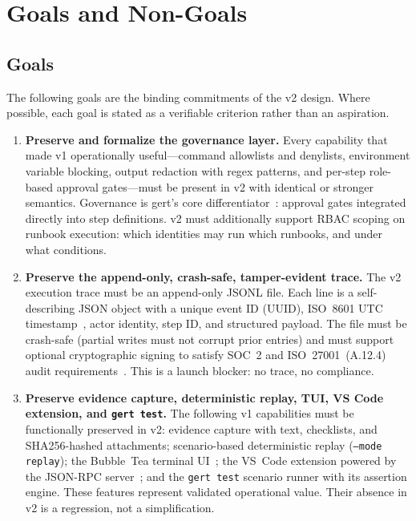 \chapter{Goals and Non-Goals}
\label{ch:goals}

\section{Goals}

The following goals are the binding commitments of the v2 design. Where possible, each goal is stated
as a verifiable criterion rather than an aspiration.

\begin{enumerate}[label=\textbf{G\arabic*.}]

  \item \textbf{Preserve and formalize the governance layer.}
    Every capability that made v1 operationally useful---command allowlists and denylists, environment
    variable blocking, output redaction with regex patterns, and per-step role-based approval
    gates---must be present in v2 with identical or stronger semantics. Governance is gert's core
    differentiator~\cite{pagerduty-automation,aws-ssm-runbooks}: approval gates
    integrated directly into step definitions. v2 must additionally support RBAC scoping on runbook
    execution: which identities may run which runbooks, and under what conditions.

  \item \textbf{Preserve the append-only, crash-safe, tamper-evident trace.}
    The v2 execution trace must be an append-only JSONL file. Each line is a self-describing JSON
    object with a unique event ID (UUID), ISO~8601 UTC timestamp~\cite{rfc3339}, actor identity, step ID, and
    structured payload. The file must be crash-safe (partial writes must not corrupt prior entries)
    and must support optional cryptographic signing to satisfy SOC~2 and ISO~27001~(A.12.4) audit
    requirements~\cite{soc2-aicpa,iso27001}. This is a launch blocker: no trace, no compliance.

  \item \textbf{Preserve evidence capture, deterministic replay, TUI, VS Code extension, and
    \texttt{gert test}.}
    The following v1 capabilities must be functionally preserved in v2: evidence capture with text,
    checklists, and SHA256-hashed attachments; scenario-based deterministic replay (\texttt{--mode
    replay}); the Bubble~Tea terminal UI~\cite{bubbletea-framework}; the VS~Code extension powered by the JSON-RPC server~\cite{jsonrpc-spec,vscode-extension-api}; and
    the \texttt{gert test} scenario runner with its assertion engine. These features represent
    validated operational value. Their absence in v2 is a regression, not a simplification.


\end{enumerate}
